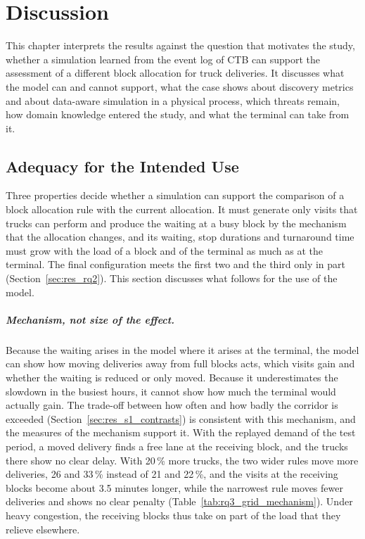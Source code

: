 \chapter{Discussion}
\label{chp:discussion}

This chapter interprets the results against the question that motivates the study,
whether a simulation learned from the event log of CTB can support the assessment of
a different block allocation for truck deliveries. It discusses what the model can
and cannot support, what the case shows about discovery metrics and about
data-aware simulation in a physical process, which threats remain, how domain
knowledge entered the study, and what the terminal can take from it.

\section{Adequacy for the Intended Use}
\label{sec:disc_adequacy}

Three properties decide whether a simulation can support the comparison of a block
allocation rule with the current allocation. It must generate only visits that trucks
can perform and produce the waiting at a busy block by the mechanism that the
allocation changes, and its waiting, stop durations and turnaround time must grow with
the load of a block and of the terminal as much as at the terminal. The final configuration
meets the first two and the third only in part (Section~\ref{sec:res_rq2}). This
section discusses what follows for the use of the model.

\paragraph{Mechanism, not size of the effect.} Because the waiting arises in the model
where it arises at the terminal, the model can show how moving deliveries away from
full blocks acts, which visits gain and whether the waiting is reduced or only moved.
Because it underestimates the slowdown in the busiest hours, it cannot show how much
the terminal would actually gain. The trade-off between how often and how badly the corridor is
exceeded (Section~\ref{sec:res_s1_contrasts}) is consistent with this mechanism, and
the measures of the mechanism support it. With the replayed demand of the test period,
a moved
delivery finds a free lane at the receiving block, and the trucks there show no clear
delay. With 20\,\% more trucks, the two wider rules move more deliveries, 26 and
33\,\% instead of 21 and 22\,\%, and the visits at the receiving blocks become about
3.5 minutes longer, while the narrowest rule moves fewer deliveries and shows no clear
penalty (Table~\ref{tab:rq3_grid_mechanism}). Under heavy congestion, the receiving
blocks thus take on part of the load that they relieve elsewhere.

